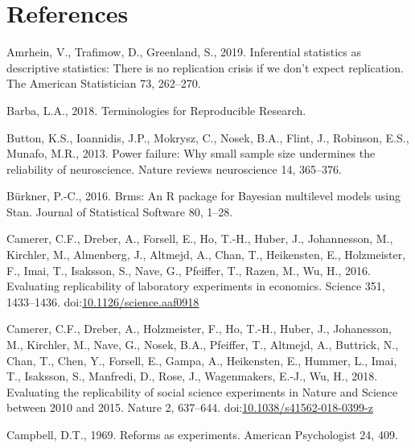 \documentclass[]{elsarticle} %
\newlength{\cslhangindent}
\newlength{\cslentryspacingunit} %
\newenvironment{CSLReferences}[2] %
 {%
  \setlength{\parindent}{0pt}
  \ifodd #1
  \let\oldpar\par
  \def\par{\hangindent=\cslhangindent\oldpar}
  \fi
  \setlength{\parskip}{#2\cslentryspacingunit}
 }%
 {}
\begin{document}
\hypertarget{references}{%
\section*{References}\label{references}}

\hypertarget{refs}{}
\begin{CSLReferences}{1}{0}
\leavevmode\hypertarget{ref-amrhein2019inferential}{}%
Amrhein, V., Trafimow, D., Greenland, S., 2019. Inferential statistics as descriptive statistics: There is no replication crisis if we don't expect replication. The American Statistician 73, 262--270.

\leavevmode\hypertarget{ref-barba_terminologies_2018}{}%
Barba, L.A., 2018. Terminologies for {Reproducible} {Research}.

\leavevmode\hypertarget{ref-button2013power}{}%
Button, K.S., Ioannidis, J.P., Mokrysz, C., Nosek, B.A., Flint, J., Robinson, E.S., Munafo, M.R., 2013. Power failure: Why small sample size undermines the reliability of neuroscience. Nature reviews neuroscience 14, 365--376.

\leavevmode\hypertarget{ref-burkner_brms_2016}{}%
Bürkner, P.-C., 2016. Brms: {An} {R} package for {Bayesian} multilevel models using {Stan}. Journal of Statistical Software 80, 1--28.

\leavevmode\hypertarget{ref-camerer_evaluating_2016}{}%
Camerer, C.F., Dreber, A., Forsell, E., Ho, T.-H., Huber, J., Johannesson, M., Kirchler, M., Almenberg, J., Altmejd, A., Chan, T., Heikensten, E., Holzmeister, F., Imai, T., Isaksson, S., Nave, G., Pfeiffer, T., Razen, M., Wu, H., 2016. Evaluating replicability of laboratory experiments in economics. Science 351, 1433--1436. doi:\href{https://doi.org/10.1126/science.aaf0918}{10.1126/science.aaf0918}

\leavevmode\hypertarget{ref-camerer_evaluating_2018}{}%
Camerer, C.F., Dreber, A., Holzmeister, F., Ho, T.-H., Huber, J., Johanesson, M., Kirchler, M., Nave, G., Nosek, B.A., Pfeiffer, T., Altmejd, A., Buttrick, N., Chan, T., Chen, Y., Forsell, E., Gampa, A., Heikensten, E., Hummer, L., Imai, T., Isaksson, S., Manfredi, D., Rose, J., Wagenmakers, E.-J., Wu, H., 2018. Evaluating the replicability of social science experiments in {Nature} and {Science} between 2010 and 2015. Nature 2, 637--644. doi:\href{https://doi.org/10.1038/s41562-018-0399-z}{10.1038/s41562-018-0399-z}

\leavevmode\hypertarget{ref-campbell_reforms_1969}{}%
Campbell, D.T., 1969. Reforms as experiments. American Psychologist 24, 409.


\end{CSLReferences}
\end{document}
